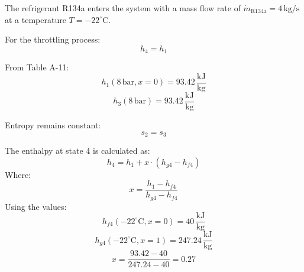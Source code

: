 The refrigerant R134a enters the system with a mass flow rate of \( \dot{m}_{\text{R134a}} = 4 \, \text{kg/s} \) at a temperature \( T = -22^\circ\text{C} \).  

For the throttling process:  
\[
h_4 = h_1
\]  

From Table A-11:  
\[
h_1(8 \, \text{bar}, x = 0) = 93.42 \, \frac{\text{kJ}}{\text{kg}}
\]  
\[
h_3(8 \, \text{bar}) = 93.42 \, \frac{\text{kJ}}{\text{kg}}
\]  

Entropy remains constant:  
\[
s_2 = s_3
\]  

The enthalpy at state 4 is calculated as:  
\[
h_4 = h_1 + x \cdot (h_{g4} - h_{f4})
\]  
Where:  
\[
x = \frac{h_1 - h_{f4}}{h_{g4} - h_{f4}}
\]  
Using the values:  
\[
h_{f4}(-22^\circ\text{C}, x = 0) = 40 \, \frac{\text{kJ}}{\text{kg}}
\]  
\[
h_{g4}(-22^\circ\text{C}, x = 1) = 247.24 \, \frac{\text{kJ}}{\text{kg}}
\]  
\[
x = \frac{93.42 - 40}{247.24 - 40} = 0.27
\]